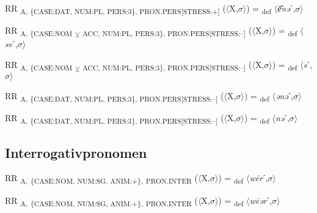 {\begin{exe}
 RR \textsubscript{A, \{CASE:DAT, NUM:PL, PERS:3\}, PRON.PERS[STRESS:+]} ($\langle$X,$\sigma $$\rangle$) = \textsubscript{def} $\langle$\textit{\=e͂nə}ˊ,$\sigma $$\rangle$
\end{exe}

\begin{exe}
 RR \textsubscript{A, \{CASE:NOM} \textsubscript{${\veebar}$}\textsubscript{ ACC, NUM:PL, PERS:3\}, PRON.PERS[STRESS:–]} ($\langle$X,$\sigma $$\rangle$) = \textsubscript{def} $\langle$\textit{se}ˊ,$\sigma $$\rangle$
\end{exe}

\begin{exe}
 RR \textsubscript{A, \{CASE:NOM} \textsubscript{${\veebar}$}\textsubscript{ ACC, NUM:PL, PERS:3\}, PRON.PERS[STRESS:–]} ($\langle$X,$\sigma $$\rangle$) = \textsubscript{def} $\langle$\textit{s}ˊ,$\sigma $$\rangle$
\end{exe}

\begin{exe}
 RR \textsubscript{A, \{CASE:DAT, NUM:PL, PERS:3\}, PRON.PERS[STRESS:–]} ($\langle$X,$\sigma $$\rangle$) = \textsubscript{def} $\langle$\textit{ənə}ˊ,$\sigma $$\rangle$
\end{exe}

\begin{exe}
 RR \textsubscript{A, \{CASE:DAT, NUM:PL, PERS:3\}, PRON.PERS[STRESS:–]} ($\langle$X,$\sigma $$\rangle$) = \textsubscript{def} $\langle$\textit{nə}ˊ,$\sigma $$\rangle$
\end{exe}

\subsection{Interrogativpronomen}

\begin{exe}
 RR \textsubscript{A,} \textsubscript{\{CASE:NOM, NUM:SG, ANIM:+\},} \textsubscript{PRON.INTER} ($\langle$X,$\sigma $$\rangle$) = \textsubscript{def} $\langle$\textit{w\=er}ˊ,$\sigma $$\rangle$
\end{exe}

\begin{exe}
 RR \textsubscript{A,} \textsubscript{\{CASE:NOM, NUM:SG, ANIM:+\},} \textsubscript{PRON.INTER} ($\langle$X,$\sigma $$\rangle$) = \textsubscript{def} $\langle$\textit{w\=eər}ˊ,$\sigma $$\rangle$
\end{exe}

}
